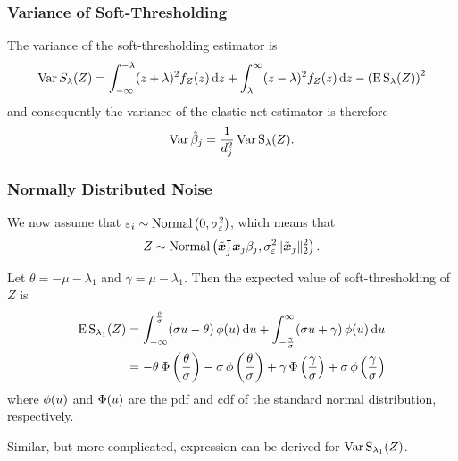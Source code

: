 \documentclass[10pt]{beamer}
\begin{document}
\begin{frame}[c]
  \frametitle{Variance of Soft-Thresholding}

  The variance of the soft-thresholding estimator is
  \begin{equation*}
    \operatorname{Var} {S_\lambda(Z)} = \int_{-\infty}^{-\lambda}(z + \lambda)^2f_Z(z) \mathop{}\!\mathrm{d} z + \int_{\lambda}^\infty (z - \lambda)^2 f_Z(z) \mathop{}\!\mathrm{d} z - \left(\operatorname{E} \operatorname{S}_\lambda(Z)\right)^2
  \end{equation*}
  and consequently the variance of the elastic net estimator is therefore
  \begin{equation*}
    \operatorname{Var} \hat\beta_j = \frac{1}{d_j^2} \operatorname{Var} \operatorname{S}_\lambda(Z).
  \end{equation*}

\end{frame}

\begin{frame}[c]
  \frametitle{Normally Distributed Noise}

  We now assume that \(\varepsilon_i \sim \operatorname{Normal}{(0, \sigma_\varepsilon^2)}\), which means
  that
  \[
    Z \sim \operatorname{Normal}\left(\tilde{\boldsymbol{x}}_j^\intercal\boldsymbol{x}_j \beta_j, \sigma_\varepsilon^2 \lVert \tilde{\boldsymbol{x}}_j\rVert_2^2 \right).
  \]

  Let \(\theta = -\mu -\lambda_1 \) and \(\gamma = \mu - \lambda_1\). Then the expected value
  of soft-thresholding of \(Z\) is
  \begin{align*}
    \operatorname{E} \operatorname{S}_{\lambda_1}(Z) & = \int_{-\infty}^\frac{\theta}{\sigma} (\sigma u - \theta) \operatorname{\phi}(u) \mathop{}\!\mathrm{d} u + \int_{-\frac{\gamma}{\sigma}}^\infty (\sigma u + \gamma) \operatorname{\phi}(u) \mathop{}\!\mathrm{d} u                                               \nonumber \\
                          & = -\theta \operatorname{\Phi}\left(\frac{\theta}{\sigma}\right) - \sigma \operatorname{\phi}\left(\frac{\theta}{\sigma}\right) + \gamma \operatorname{\Phi}\left(\frac{\gamma}{\sigma}\right) + \sigma \operatorname{\phi}\left(\frac{\gamma}{\sigma}\right)
  \end{align*}
  where \(\operatorname{\phi}(u)\) and \(\operatorname{\Phi}(u)\) are the pdf and cdf of the standard normal distribution, respectively.

  \bigskip\pause

  Similar, but more complicated, expression can be derived for \(\operatorname{Var} \operatorname{S}_{\lambda_1}(Z)\).

\end{frame}
\end{document}
